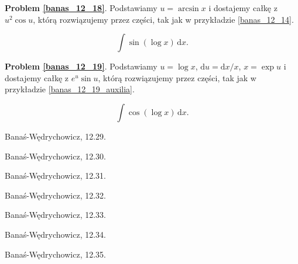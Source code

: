 \begin{multicols}{2}
\textbf{Problem \ref{banas_12_18}}. %
Podstawiamy $u = \arcsin x$ i dostajemy całkę z $u^2 \cos u$, którą rozwiązujemy przez części, tak jak w przykładzie \ref{banas_12_14}. %

\begin{problem}
    \label{banas_12_19}%
    \begin{equation}
        \int \sin(\log x) \, \mathrm{d}x.
    \end{equation}
\end{problem}

\textbf{Problem \ref{banas_12_19}}. %
Podstawiamy $u = \log x$, $\mathrm{d} u = \mathrm{d} x / x$, $x = \exp u$ i dostajemy całkę z $e^u \sin u$, którą rozwiązujemy przez części, tak jak w przykładzie \ref{banas_12_19_auxilia}. %

\begin{problem}
    \label{banas_12_20}%
    \begin{equation}
        \int \cos(\log x) \, \mathrm{d}x.
    \end{equation}
\end{problem}    

\begin{problem}
    Banaś-Wędrychowicz, 12.29.
\end{problem}

\begin{problem}
    Banaś-Wędrychowicz, 12.30.
\end{problem}

\begin{problem}
    Banaś-Wędrychowicz, 12.31.
\end{problem}

\begin{problem}
    Banaś-Wędrychowicz, 12.32.
\end{problem}

\begin{problem}
    Banaś-Wędrychowicz, 12.33.
\end{problem}

\begin{problem}
    Banaś-Wędrychowicz, 12.34.
\end{problem}

\begin{problem}
    Banaś-Wędrychowicz, 12.35.
\end{problem}


\end{multicols}
